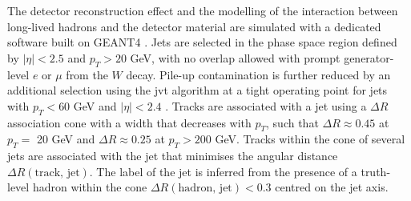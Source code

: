 The detector reconstruction effect and the modelling of the interaction between long-lived hadrons and the detector material are simulated with a dedicated software \cite{ATLASSimulationInfra} built on GEANT4 \cite{Agostinelli:602040}. Jets are selected in the phase space region defined by $|\eta| < 2.5$ and $p_T > 20$ GeV, with no overlap allowed with prompt generator-level $e$ or $\mu$ from the $W$ decay. Pile-up contamination is further reduced by an additional selection using the \gls{jvt} algorithm at a tight operating point for jets with $p_T < 60$ GeV and $|\eta| < 2.4$ \cite{ATLAS-CONF-2014-018}. Tracks are associated with a jet using a $\Delta R$ association cone with a width that decreases with $p_T$, such that $\Delta R \approx 0.45$ at $p_T =$ 20 GeV and $\Delta R \approx 0.25$ at $p_T > 200$ GeV. Tracks within the cone of several jets are associated with the jet that minimises the angular distance $\Delta R(\textrm{track, jet})$. The label of the jet is inferred from the presence of a truth-level hadron within the cone $\Delta R(\textrm{hadron, jet}) < 0.3$ centred on the jet axis.

